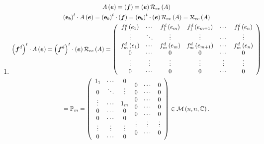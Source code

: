 \documentclass[aps,preprint]{revtex4}%
\begin{document}
\begin{enumerate}
\begin{enumerate}
\item
\begin{gather}
A\left(  \boldsymbol{e}\right)  =\left(  \boldsymbol{f}\right)  =\left(
\boldsymbol{e}\right)  \mathcal{R}_{ee}\left(  A\right) \\
\left(  \mathbf{e}_{b}\right)  ^{t}\cdot A\left(  \boldsymbol{e}\right)
=\left(  \mathbf{e}_{b}\right)  ^{t}\cdot\left(  \boldsymbol{f}\right)
=\left(  \mathbf{e}_{b}\right)  ^{t}\cdot\left(  \boldsymbol{e}\right)
\mathcal{R}_{ee}\left(  A\right)  =\mathcal{R}_{ee}\left(  A\right) \\
\left(  \boldsymbol{f}^{d}\right)  ^{t}\cdot A\left(  \boldsymbol{e}\right)
=\left(  \boldsymbol{f}^{d}\right)  ^{t}\cdot\left(  \boldsymbol{e}\right)
\mathcal{R}_{ee}\left(  A\right)  =\left(
\begin{array}
[c]{ccc}%
f_{1}^{d}\left(  e_{1}\right)  & \cdots & f_{1}^{d}\left(  e_{m}\right) \\
\vdots & \ddots & \vdots\\
f_{m}^{d}\left(  e_{1}\right)  & \cdots & f_{m}^{d}\left(  e_{m}\right) \\
0 & \cdots & 0\\
\vdots & \vdots & \vdots\\
0 & \cdots & 0
\end{array}%
\begin{array}
[c]{ccc}%
f_{1}^{d}\left(  e_{m+1}\right)  & \cdots & f_{1}^{d}\left(  e_{n}\right) \\
\vdots & \cdots & \vdots\\
f_{m}^{d}\left(  e_{m+1}\right)  & \cdots & f_{m}^{d}\left(  e_{n}\right) \\
0 & \cdots & 0\\
\vdots & \vdots & \vdots\\
0 & \cdots & 0
\end{array}
\right) \\
=\mathbb{P}_{m}=\left(
\begin{array}
[c]{ccc}%
1_{1} & \cdots & 0\\
0 & \ddots & \vdots\\
\vdots & \cdots & 1_{m}\\
0 & \cdots & 0\\
0 & \cdots & 0\\
\vdots & \vdots & \vdots\\
0 & \cdots & 0
\end{array}%
\begin{array}
[c]{ccc}%
0 & \cdots & 0\\
0 & \cdots & 0\\
0 & \cdots & 0\\
0 & \cdots & 0\\
0 & \cdots & 0\\
\vdots & \vdots & \vdots\\
0 & \cdots & 0
\end{array}
\right)  \in\mathcal{M}\left(  n,n,\mathbb{C}\right)  .
\end{gather}



\end{enumerate}
\end{enumerate}
\end{document}
